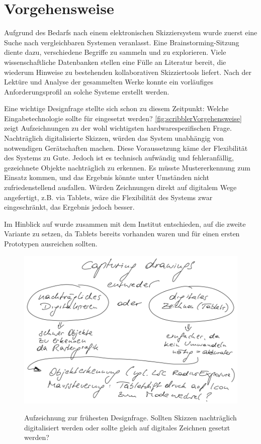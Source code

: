 \section{Vorgehensweise} 
Aufgrund des Bedarfs nach einem elektronischen Skizziersystem wurde zuerst eine Suche nach vergleichbaren Systemen veranlasst. Eine Brainstorming-Sitzung diente dazu, verschiedene Begriffe zu sammeln und zu explorieren. Viele wissenschaftliche Datenbanken stellen eine Fülle an Literatur bereit, die wiederum Hinweise zu bestehenden kollaborativen Skizziertools liefert. Nach der Lektüre und Analyse der gesammelten Werke konnte ein vorläufiges Anforderungsprofil an solche Systeme erstellt werden.

Eine wichtige Designfrage stellte sich schon zu diesem Zeitpunkt: Welche Eingabetechnologie sollte für \scribbler eingesetzt werden? \autoref{fig:scribblerVorgehensweise} zeigt Aufzeichnungen zu der wohl wichtigsten hardwarespezifischen Frage. Nachträglich digitalisierte Skizzen, würden das System unabhängig von notwendigen Gerätschaften machen. Diese Voraussetzung käme der Flexibilität des Systems zu Gute. Jedoch ist es technisch aufwändig und fehleranfällig, gezeichnete Objekte nachträglich zu erkennen. Es müsste Mustererkennung zum Einsatz kommen, und das Ergebnis könnte unter Umständen nicht zufriedenstellend ausfallen. Würden Zeichnungen direkt auf digitalem Wege angefertigt, z.B. via Tablets, wäre die Flexibilität des Systems zwar eingeschränkt, das Ergebnis jedoch besser.

Im Hinblick auf \scribbler wurde zusammen mit dem Institut entschieden, auf die zweite Variante zu setzen, da Tablets bereits vorhanden waren und für einen ersten Prototypen ausreichen sollten.

\begin{figure}
	        {\includegraphics[width=1\linewidth]{gfx/scribblerVorgehensweise}}
		\caption[Aufzeichnung zur frühesten Designfrage]{Aufzeichnung zur frühesten Designfrage. Sollten Skizzen nachträglich digitalisiert werden oder sollte gleich auf digitales Zeichnen gesetzt werden?}\label{fig:scribblerVorgehensweise}
\end{figure}

